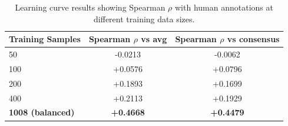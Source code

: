 \begin{table}[t]
\centering
\caption{Learning curve results showing Spearman $\rho$ with human annotations at different training data sizes.}
\label{tab:learning_curve}
\begin{tabular}{lcc}
\toprule
Training Samples & Spearman $\rho$ vs avg & Spearman $\rho$ vs consensus \\
\midrule
50 & -0.0213 & -0.0062 \\
100 & +0.0576 & +0.0796 \\
200 & +0.1893 & +0.1699 \\
400 & +0.2113 & +0.1929 \\
\textbf{1008 (balanced)} & \textbf{+0.4668} & \textbf{+0.4479} \\
\bottomrule
\end{tabular}
\end{table}